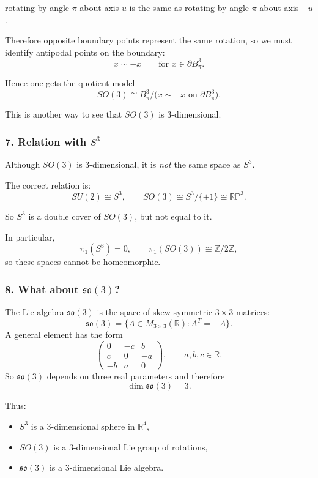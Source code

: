 \documentclass[12pt,a4paper]{article}
\theoremstyle{notespace}
\begin{document}
rotating by angle \(\pi\) about axis \(u\) is the same as rotating by angle \(\pi\) about axis \(-u\).

Therefore opposite boundary points represent the same rotation, so we must identify antipodal points on the boundary:
\[
x\sim -x \qquad \text{for } x\in \partial B_\pi^3.
\]

Hence one gets the quotient model
\[
\boxed{
	SO(3)\cong B_\pi^3/\bigl(x\sim -x \text{ on } \partial B_\pi^3\bigr).
}
\]

This is another way to see that \(SO(3)\) is \(3\)-dimensional.

\subsubsection*{7. Relation with \texorpdfstring{\(S^3\)}{S3}}

Although \(SO(3)\) is \(3\)-dimensional, it is \emph{not} the same space as \(S^3\).

The correct relation is:
\[
SU(2)\cong S^3,
\qquad
SO(3)\cong S^3/\{\pm 1\}\cong \mathbb{RP}^3.
\]

So \(S^3\) is a double cover of \(SO(3)\), but not equal to it.

In particular,
\[
\pi_1(S^3)=0,
\qquad
\pi_1(SO(3))\cong \mathbb Z/2\mathbb Z,
\]
so these spaces cannot be homeomorphic.

\subsubsection*{8. What about \texorpdfstring{\(\mathfrak{so}(3)\)}{so(3)}?}

The Lie algebra \(\mathfrak{so}(3)\) is the space of skew-symmetric \(3\times 3\) matrices:
\[
\mathfrak{so}(3)=\{A\in M_{3\times 3}(\mathbb R): A^T=-A\}.
\]
A general element has the form
\[
\begin{pmatrix}
	0 & -c & b\\
	c & 0 & -a\\
	-b & a & 0
\end{pmatrix},
\qquad a,b,c\in \mathbb R.
\]
So \(\mathfrak{so}(3)\) depends on three real parameters and therefore
\[
\boxed{\dim \mathfrak{so}(3)=3.}
\]

Thus:
\begin{itemize}
	\item \(S^3\) is a \(3\)-dimensional sphere in \(\mathbb R^4\),
	\item \(SO(3)\) is a \(3\)-dimensional Lie group of rotations,
	\item \(\mathfrak{so}(3)\) is a \(3\)-dimensional Lie algebra.
\end{itemize}
\end{document}
